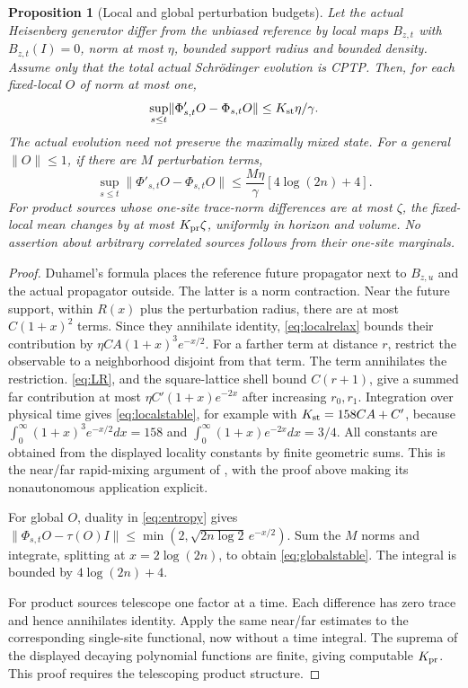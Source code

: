 \documentclass[11pt,reqno]{amsart}
\numberwithin{equation}{section}
\newtheorem{proposition}[theorem]{Proposition}
\theoremstyle{definition}
\theoremstyle{remark}
\newcommand{\nn}[1]{\lVert#1\rVert}
\begin{document}
\begin{proposition}[Local and global perturbation budgets]\label{prop:stability}
Let the actual Heisenberg generator differ from the unbiased reference by local maps $B_{z,t}$ with $B_{z,t}(I)=0$, norm at most $\eta$, bounded support radius and bounded density. Assume only that the total actual Schr\"odinger evolution is CPTP. Then, for each fixed-local $O$ of norm at most one,
\begin{equation}\label{eq:localstable}
 \sup_{s\leq t}\nn{\Phi'_{s,t}O-\Phi_{s,t}O}
 \leq K_{\rm st}\eta/\gamma.
\end{equation}
The actual evolution need not preserve the maximally mixed state. For a general $\nn O\leq1$, if there are $M$ perturbation terms,
\begin{equation}\label{eq:globalstable}
 \sup_{s\leq t}\nn{\Phi'_{s,t}O-\Phi_{s,t}O}
 \leq\frac{M\eta}{\gamma}[4\log(2n)+4].
\end{equation}
For product sources whose one-site trace-norm differences are at most $\zeta$, the fixed-local mean changes by at most $K_{\rm pr}\zeta$, uniformly in horizon and volume. No assertion about arbitrary correlated sources follows from their one-site marginals.
\end{proposition}
\begin{proof}
Duhamel's formula places the reference future propagator next to $B_{z,u}$ and the actual propagator outside. The latter is a norm contraction. Near the future support, within $R(x)$ plus the perturbation radius, there are at most $C(1+x)^2$ terms. Since they annihilate identity, \eqref{eq:localrelax} bounds their contribution by
$\eta C A(1+x)^3e^{-x/2}$.
For a farther term at distance $r$, restrict the observable to a neighborhood disjoint from that term. The term annihilates the restriction. \eqref{eq:LR}, and the square-lattice shell bound $C(r+1)$, give a summed far contribution at most $\eta C'(1+x)e^{-2x}$ after increasing $r_0,r_1$. Integration over physical time gives \eqref{eq:localstable}, for example with
$K_{\rm st}=158CA+C'$, because
$\int_0^\infty(1+x)^3e^{-x/2}dx=158$ and
$\int_0^\infty(1+x)e^{-2x}dx=3/4$.
All constants are obtained from the displayed locality constants by finite geometric sums. This is the near/far rapid-mixing argument of \cite[Theorem~1]{LCMP}, with the proof above making its nonautonomous application explicit.

For global $O$, duality in \eqref{eq:entropy} gives
$\nn{\Phi_{s,t}O-\tau(O)I}\leq\min(2,\sqrt{2n\log2}\,e^{-x/2})$.
Sum the $M$ norms and integrate, splitting at $x=2\log(2n)$, to obtain \eqref{eq:globalstable}. The integral is bounded by $4\log(2n)+4$.

For product sources telescope one factor at a time. Each difference has zero trace and hence annihilates identity. Apply the same near/far estimates to the corresponding single-site functional, now without a time integral. The suprema of the displayed decaying polynomial functions are finite, giving computable $K_{\rm pr}$. This proof requires the telescoping product structure.
\end{proof}
\end{document}
